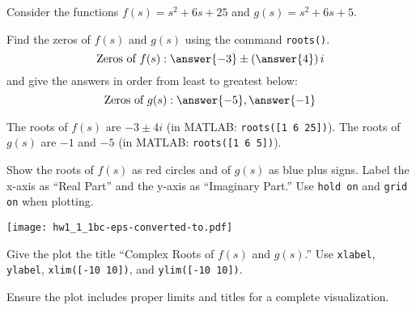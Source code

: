 \documentclass{ximera}
\author{Jont Allen}
\begin{document}
\begin{problem}
    Consider the functions \(f(s) = s^2 + 6s + 25\) and \(g(s) = s^2 + 6s + 5\).
    
    Find the zeros of \(f(s)\) and \(g(s)\) using the command \texttt{roots()}.
    \[
    \text{Zeros of } f(s): \answer{-3} \pm \left(\answer{4}\right)i
    \]
    and give the answers in order from least to greatest below:
    \[
    \text{Zeros of } g(s): \answer{-5}, \answer{-1}
    \]
    \begin{feedback}[correct]
    The roots of \(f(s)\) are \(-3 \pm 4i\) (in MATLAB: \texttt{roots([1 6 25])}). The roots of \(g(s)\) are \(-1\) and \(-5\) (in MATLAB: \texttt{roots([1 6 5])}).
    \end{feedback}
\end{problem}

\begin{problem}
    Show the roots of \(f(s)\) as red circles and of \(g(s)\) as blue plus signs.
    Label the x-axis as ``Real Part'' and the y-axis as ``Imaginary Part.'' Use \texttt{hold on} and \texttt{grid on} when plotting.
    \begin{multipleChoice}
    \end{multipleChoice}
\begin{feedback}[correct]
\begin{center}
\texttt{[image: hw1\_1\_1bc-eps-converted-to.pdf]}
\end{center}
    \end{feedback}
\end{problem}

\begin{problem}
    Give the plot the title ``Complex Roots of \(f(s)\) and \(g(s)\).'' Use \texttt{xlabel}, \texttt{ylabel}, \texttt{xlim([-10 10])}, and \texttt{ylim([-10 10])}.
    \begin{multipleChoice}
    \end{multipleChoice}
    \begin{feedback}[correct]
    Ensure the plot includes proper limits and titles for a complete visualization.
    \end{feedback}
\end{problem}
\end{document}
